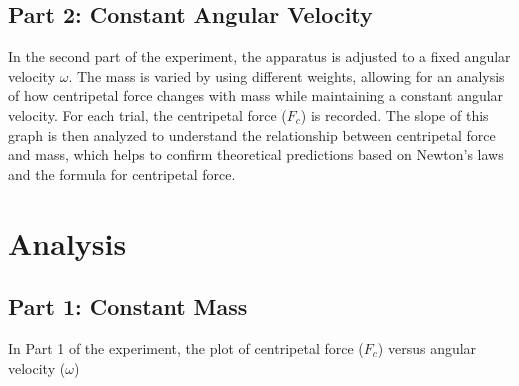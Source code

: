\documentclass{report}
\begin{document}
\subsection{Part 2: Constant Angular Velocity}
In the second part of the experiment, the apparatus is adjusted to a fixed angular velocity \( \omega \). The mass is varied by using different weights, allowing for an analysis of how centripetal force changes with mass while maintaining a constant angular velocity. For each trial, the centripetal force (\( F_c \)) is recorded. The slope of this graph is then analyzed to understand the relationship between centripetal force and mass, which helps to confirm theoretical predictions based on Newton's laws and the formula for centripetal force.







\newpage
\section{Analysis}
\subsection{Part 1: Constant Mass}
In Part 1 of the experiment, the plot of centripetal force (\( F_{c} \))  versus angular velocity (\( \omega \)) 
\end{document}
